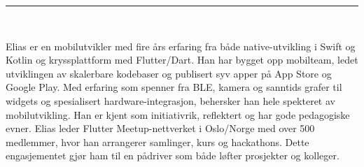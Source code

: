 \documentclass[a4paper,10pt]{article}
\begin{document}

\vspace{3em}

\begin{paracol}{2}
\begin{flushleft}

    \vspace{1em}
    \noindent\rule{4cm}{10pt}
    

    \vspace{1.5em}
    {\Huge {}} \\
    \vspace{0.5em}
    
    \begin{tcolorbox}[
        colback=white,       %
        colframe=white,      %
        boxrule=0.0pt,       %
        arc=2mm,             %
        width=0.85\linewidth,%
        left=0mm, right=2mm, top=1mm, bottom=1mm %
        ]
    
    Elias er en mobilutvikler med 
    fire års erfaring fra både native-utvikling
     i Swift og Kotlin og kryssplattform med Flutter/Dart.
      Han har bygget opp mobilteam,
       ledet utviklingen av skalerbare
        kodebaser og publisert syv apper 
        på App Store og Google Play. 
        Med erfaring som spenner fra BLE,
         kamera og sanntids grafer til widgets 
         og spesialisert hardware-integrasjon,
          behersker han hele spekteret av
           mobilutvikling.
      Han er kjent som initiativrik, 
      reflektert og har gode pedagogiske evner.
       Elias leder Flutter Meetup-nettverket i 
       Oslo/Norge med over 500 medlemmer,
        hvor han arrangerer samlinger, 
        kurs og hackathons. 
        Dette engasjementet 
        gjør ham til en pådriver som både løfter
         prosjekter og kolleger.
    \end{tcolorbox}
\end{flushleft}


\end{paracol}
\end{document}
